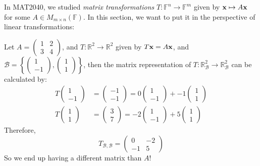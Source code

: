\begin{example} \label{eg:matrix_transformation}
In MAT2040, we studied \emph{matrix transformations} $T:\mathbb{F}^n \to \mathbb{F}^m$ given by ${\bf x} \mapsto A{\bf x}$ for some $A \in M_{m \times n}(\mathbb{F})$. In this section, we want to put it in the perspective of linear transformations:

    Let $A = \begin{pmatrix}
        1 & 2 \\ 3 & 4
    \end{pmatrix}$, and $T: \mathbb{R}^2 \to \mathbb{R}^2$ given by $T{\bf x} = A{\bf x}$, and $\mathcal{B} = \left\{\begin{pmatrix}
        1 \\ -1
    \end{pmatrix}, \begin{pmatrix}
        1 \\ 1
    \end{pmatrix}\right\}$, then the matrix representation of $T: \mathbb{R}^2_{\mathcal{B}} \to \mathbb{R}^2_{\mathcal{B}}$ can be calculated by:
    \begin{align*}T\begin{pmatrix}
        1 \\ -1
    \end{pmatrix} &= \begin{pmatrix}
        -1 \\ -1
    \end{pmatrix} = 0\begin{pmatrix}
        1 \\ -1
    \end{pmatrix}+ -1\begin{pmatrix}
        1 \\ 1
    \end{pmatrix}\\
    T\begin{pmatrix}
        1 \\ 1
    \end{pmatrix} &= \begin{pmatrix}
        3 \\ 7
    \end{pmatrix} = -2\begin{pmatrix}
        1 \\ -1
    \end{pmatrix}+ 5\begin{pmatrix}
        1 \\ 1
    \end{pmatrix}
    \end{align*}
Therefore,
$$T_{\mathcal{B},\mathcal{B}} = \begin{pmatrix}
        0 & -2 \\ -1 & 5
    \end{pmatrix}$$
So we end up having a different matrix than $A$!


\end{example}
